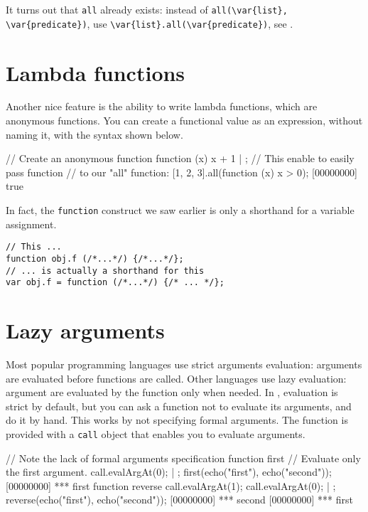 It turns out that \lstinline|all| already exists: instead of
\lstinline|all(\var{list}, \var{predicate})|, use
\lstinline|\var{list}.all(\var{predicate})|, see
.

\section{Lambda functions}

Another nice feature is the ability to write lambda functions, which
are anonymous functions. You can create a functional value as an
expression, without naming it, with the syntax shown below.

\begin{urbiscript}
// Create an anonymous function
function (x) {x + 1} | {};
// This enable to easily pass function
// to our "all" function:
[1, 2, 3].all(function (x) { x > 0});
[00000000] true
\end{urbiscript}

In fact, the \lstinline{function} construct we saw earlier is only a
shorthand for a variable assignment.

\begin{lstlisting}
// This ...
function obj.f (/*...*/) {/*...*/};
// ... is actually a shorthand for this
var obj.f = function (/*...*/) {/* ... */};
\end{lstlisting}

\section{Lazy arguments}

Most popular programming languages use strict arguments evaluation:
arguments are evaluated before functions are called. Other languages
use lazy evaluation: argument are evaluated by the function only when
needed. In \us, evaluation is strict by default, but you can ask a
function not to evaluate its arguments, and do it by hand. This works
by not specifying formal arguments. The function is provided with a
\lstinline{call} object that enables you to evaluate arguments.

\begin{urbiscript}
// Note the lack of formal arguments specification
function first
{
  // Evaluate only the first argument.
  call.evalArgAt(0);
} | {};
first(echo("first"), echo("second"));
[00000000] *** first
function reverse
{
  call.evalArgAt(1);
  call.evalArgAt(0);
} | {};
reverse(echo("first"), echo("second"));
[00000000] *** second
[00000000] *** first
\end{urbiscript}

